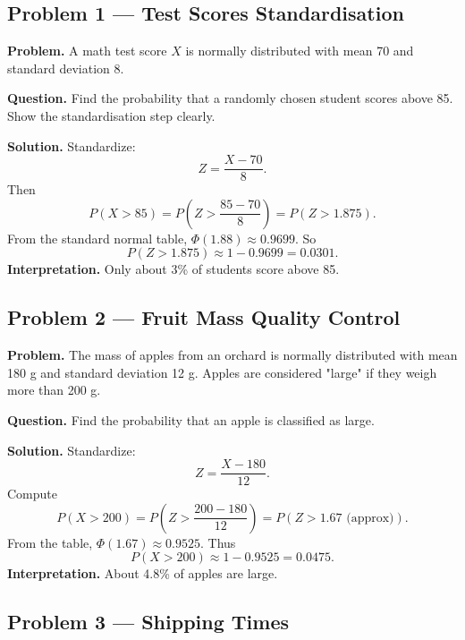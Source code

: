 	\begin{ExamProblems}
		
		\hypertarget{c6-ex1}{}
		\item
		\subsection*{Problem 1 — Test Scores Standardisation}
		
		\textbf{Problem.}
		A math test score \(X\) is normally distributed with mean 70 and standard deviation 8.
		
		\textbf{Question.} Find the probability that a randomly chosen student scores above 85.
		Show the standardisation step clearly.
		
		\textbf{Solution.}
		Standardize:
		\[
		Z=\frac{X-70}{8}.
		\]
		Then
		\[
		P(X>85)=P\left(Z>\frac{85-70}{8}\right)=P(Z>1.875).
		\]
		From the standard normal table, \(\Phi(1.88)\approx 0.9699\).
		So
		\[
		P(Z>1.875)\approx 1-0.9699=0.0301.
		\]
		\textbf{Interpretation.} Only about 3\% of students score above 85.
		
		
		\hypertarget{c6-ex2}{}
		\item
		\subsection*{Problem 2 — Fruit Mass Quality Control}
		
		\textbf{Problem.}
		The mass of apples from an orchard is normally distributed with mean 180 g
		and standard deviation 12 g. Apples are considered "large" if they weigh more than 200 g.
		
		\textbf{Question.} Find the probability that an apple is classified as large.
		
		\textbf{Solution.}
		Standardize:
		\[
		Z=\frac{X-180}{12}.
		\]
		Compute
		\[
		P(X>200)=P\left(Z>\frac{200-180}{12}\right)=P(Z>1.67\text{ (approx)}).
		\]
		From the table, \(\Phi(1.67)\approx 0.9525\).
		Thus
		\[
		P(X>200)\approx 1-0.9525=0.0475.
		\]
		\textbf{Interpretation.} About 4.8\% of apples are large.
		
		
		\hypertarget{c6-ex3}{}
		\item
		\subsection*{Problem 3 — Shipping Times}
		

\end{ExamProblems}
